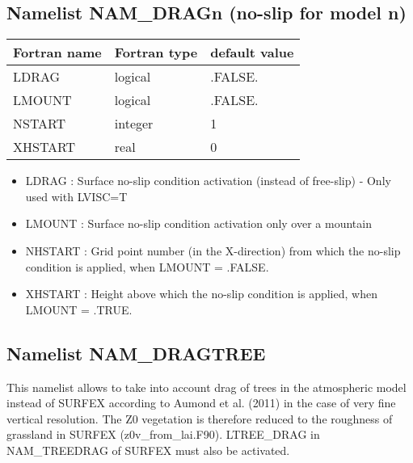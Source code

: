 \subsection{Namelist NAM\_DRAGn (no-slip for model n)}
\begin{center}
\begin{tabular}{|l|l|l| }
\hline 
 Fortran name  & Fortran type  & default value \\
\hline
 LDRAG & logical       & .FALSE.           \\
 LMOUNT & logical       & .FALSE.           \\
 NSTART & integer       & 1           \\
 XHSTART & real       & 0           \\
 \hline
\end{tabular}
\end{center}

\begin{itemize}
\item   {}
LDRAG : Surface no-slip condition activation (instead of free-slip) - Only used with LVISC=T

\item   {}
LMOUNT : Surface no-slip condition activation only over a mountain

\item   {}
NHSTART : Grid point number (in the X-direction) from which the no-slip condition is applied, when LMOUNT = .FALSE.

\item   {}
XHSTART : Height above  which the no-slip condition is applied, when LMOUNT = .TRUE. 

\end{itemize}

\subsection{Namelist NAM\_DRAGTREE}
This namelist allows to take into account drag of trees in the atmospheric model instead of SURFEX according
to Aumond et al. (2011) in the case of very fine vertical resolution. 
The Z0 vegetation is therefore reduced to the roughness of grassland in SURFEX
 (z0v\_from\_lai.F90). LTREE\_DRAG in NAM\_TREEDRAG of SURFEX must also be activated.

